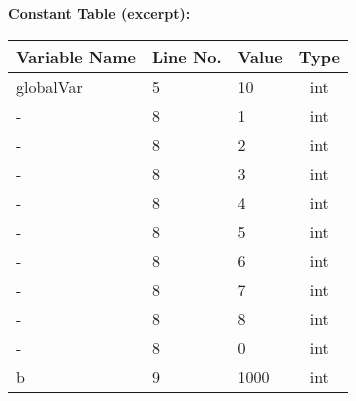 \documentclass[12pt]{article}
\begin{document}
\bigskip
\vspace{1em}
\textbf{Constant Table (excerpt):}
\begin{center}
\begin{tabular}{|l|l|l|c|}
\hline
Variable Name & Line No. & Value  & Type \\
\hline
globalVar & 5  & 10   & int \\
- & 8 & 1 & int \\
- & 8 & 2 & int \\
- & 8 & 3 & int \\
- & 8 & 4 & int \\
- & 8 & 5 & int \\
- & 8 & 6 & int \\
- & 8 & 7 & int \\
- & 8 & 8 & int \\
- & 8 & 0 & int \\
b & 9 & 1000  & int \\
\hline
\end{tabular}
\end{center}
\vspace{1em}


% 
\end{document}
